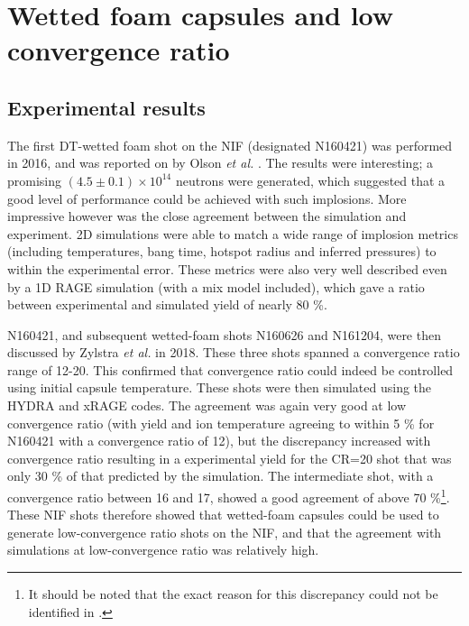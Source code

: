 \section{Wetted foam capsules and low convergence ratio}

\subsection{Experimental results}

The first DT-wetted foam shot on the NIF (designated N160421) was performed in 2016, and was reported on by Olson \textit{et al.} \cite{Olson2016}. The results were interesting; a promising $(4.5 \pm 0.1) \times 10^{14}$ neutrons were generated, which suggested that a good level of performance could be achieved with such implosions. More impressive however was the close agreement between the simulation and experiment. 2D simulations were able to match a wide range of implosion metrics (including temperatures, bang time, hotspot radius and inferred pressures) to within the experimental error. These metrics were also very well described even by a 1D RAGE simulation (with a mix model included), which gave a ratio between experimental and simulated yield of nearly 80 \%. 

N160421, and subsequent wetted-foam shots N160626 and N161204, were then discussed by Zylstra \textit{et al.} \cite{Zylstra2018} in 2018. These three shots spanned a convergence ratio range of 12-20. This confirmed that convergence ratio could indeed be controlled using initial capsule temperature. These shots were then simulated using the HYDRA and xRAGE codes. The agreement was again very good at low convergence ratio (with yield and ion temperature agreeing to within 5 \% for N160421 with a convergence ratio of 12), but the discrepancy increased with convergence ratio resulting in a experimental yield for the CR=20 shot that was only 30 \% of that predicted by the simulation. The intermediate shot, with a convergence ratio between 16 and 17, showed a good agreement of above 70 \%\footnote{It should be noted that the exact reason for this discrepancy could not be identified in \cite{Zylstra2018}.}. These NIF shots therefore showed that wetted-foam capsules could be used to generate low-convergence ratio shots on the NIF, and that the agreement with simulations at low-convergence ratio was relatively high.

